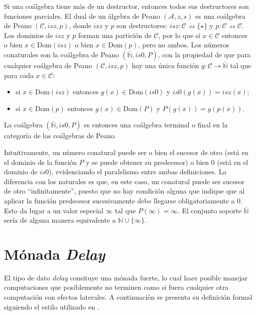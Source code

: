 Si una coálgebra tiene más de un destructor, entonces todos sus destructores son funciones parciales. El dual de un álgebra de Peano $(\mathcal{A},z,s)$ es una coálgebra de Peano $(\mathcal{C},isz,p)$, donde $isz$ y $p$ son destructores: $isz: \mathcal{C} \nrightarrow  \{\star\}$ y $p : \mathcal{C} \nrightarrow \mathcal{C}$. Los dominios de $isz$ y $p$ forman una partición de $\mathcal{C}$, por lo que si $x \in \mathcal{C}$ entonces o bien $x \in \mathrm{Dom}(isz)$ o bien $x \in \mathrm{Dom}(p)$, pero no ambos. Los números conaturales son la coálgebra de Peano $(\bar{\mathbb{N}},is0,P)$, con la propiedad de que para cualquier coálgebra de Peano $(\mathcal{C},isz,p)$ hay una única función $g : \mathcal{C} \rightarrow \bar{\mathbb{N}}$ tal que para cada $x \in \mathcal{C}$:
\begin{itemize}
\item si $x \in \mathrm{Dom}(isz)$ entonces $g(x) \in \mathrm{Dom}(is0)$ y $is0(g(x)) = isz(x)$;
\item si $x \in \mathrm{Dom}(p)$ entonces $g(x) \in \mathrm{Dom}(P)$ y $P(g(x)) = g(p(x))$.
\end{itemize}

La coálgebra $(\bar{\mathbb{N}},is0,P)$ es entonces una coálgebra terminal o final en la categoría de las coálgebras de Peano.  

Intuitivamente, un número conatural puede ser o bien el sucesor de otro (está en el dominio de la función $P$ y se puede obtener su predecesor) o bien $0$ (está en el dominio de $is0$), evidenciando el paralelismo entre ambas definiciones. La diferencia con los naturales es que, en este caso, un conatural puede ser sucesor de otro ``infinitamente'', puesto que no hay condición alguna que indique que al aplicar la función predecesor sucesivamente debe llegarse obligatoriamente a $0$. Esto da lugar a un valor especial $\infty$ tal que $P(\infty) = \infty$. El conjunto soporte $\bar{\mathbb{N}}$ sería de alguna manera equivalente a $\mathbb{N} \cup \{\infty\}$. 


\section{Mónada \textit{Delay}}\label{delay:delay}

El tipo de dato \textit{delay} consituye una mónada fuerte, lo cual hace posible manejar computaciones que posiblemente no terminen como si fuera cualquier otra computación con efectos laterales. A continuación se presenta su definición formal siguiendo el estilo utilizado en \cite{chapman:2019}. 

